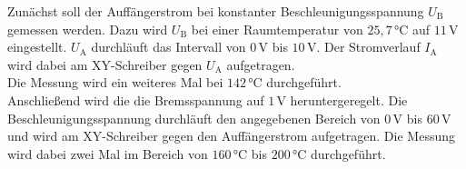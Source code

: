 Zunächst soll der Auffängerstrom bei konstanter Beschleunigungsspannung $U_\text{B}$ gemessen werden.
Dazu wird $U_\text{B}$ bei einer Raumtemperatur von $25,7 \,\unit{\celsius}$ auf $11 \,\unit{\volt}$ eingestellt.
$U_\text{A}$ durchläuft das Intervall von $0 \,\unit{\volt}$ bis $10 \,\unit{\volt}$.
Der Stromverlauf $I_\text{A}$ wird dabei am XY-Schreiber gegen $U_\text{A}$ aufgetragen. \\

Die Messung wird ein weiteres Mal bei $142 \,\unit{\celsius}$ durchgeführt. \\

Anschließend wird die die Bremsspannung auf $1 \,\unit{\volt}$ heruntergeregelt.
Die Beschleunigungsspannung durchläuft den angegebenen Bereich von
$0 \,\unit{\volt}$ bis $60 \,\unit{\volt}$ und wird am XY-Schreiber gegen den Auffängerstrom aufgetragen.
Die Messung wird dabei zwei Mal im Bereich von $160 \,\unit{\celsius}$ bis $200 \,\unit{\celsius}$ durchgeführt.



